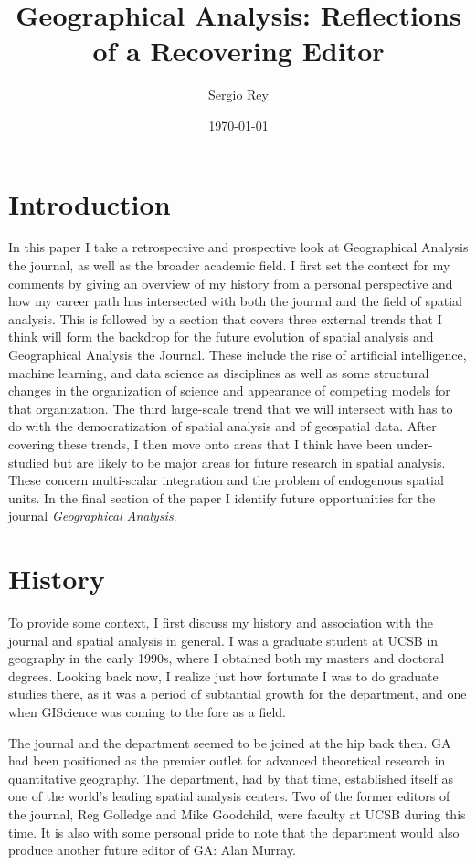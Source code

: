 \documentclass[11pt]{article}
\author{Sergio Rey}
\date{\today}
\title{Geographical Analysis: Reflections of a Recovering Editor}
\begin{document}
\maketitle

\section{Introduction}
\label{sec:org79c12a3}

In this paper I take a retrospective and prospective look at 
Geographical Analysis the journal, as well as  the broader academic
field. I first set the context for my comments by giving an overview of my
history from a personal perspective and how my career path has intersected with
both the journal and the field of spatial analysis. This is followed by a
section that covers three external trends that I think will form the backdrop
for the future evolution of spatial analysis and Geographical Analysis the
Journal. These include the rise of artificial intelligence, machine learning,
and data science as disciplines as well as some structural changes in the
organization of science and appearance of competing models for that
organization. The third large-scale trend that we will intersect with has to do
with the democratization of spatial analysis and of geospatial data. After
covering these trends, I then move onto areas that I think have been
under-studied but are likely to be major areas for future research in spatial
analysis. These concern multi-scalar integration and the problem of endogenous
spatial units. In the final section of the paper I identify future opportunities
for the journal \emph{Geographical Analysis}.

\section{History}
\label{sec:orgfb43d5b}
To provide some context, I first discuss my history and association with the
journal and spatial analysis in general. I was a graduate student at UCSB in
geography in the early 1990s, where I obtained both my masters and doctoral
degrees. Looking back now, I realize just how fortunate I was to do graduate studies
there, as it was a period of subtantial growth for the department, and one when
GIScience was coming to the fore as a field.

The journal and the department seemed to be joined at the hip back then. GA had
been positioned as the premier outlet for advanced theoretical research in
quantitative geography. The department, had by that time, established itself as
one of the world's leading spatial analysis centers. Two of the former editors
of the journal, Reg Golledge and Mike Goodchild, were faculty at UCSB during
this time. It is also with some personal pride to note that the department would
also produce another future editor of GA: Alan Murray.
\end{document}
